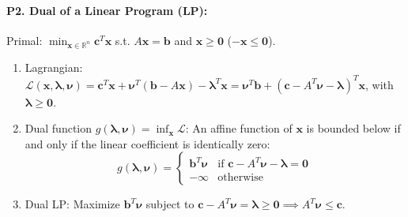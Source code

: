 \paragraph{P2. Dual of a Linear Program (LP):}
Primal: $\min_{\mathbf{x} \in \mathbb{R}^n} \mathbf{c}^T \mathbf{x}$ s.t. $A\mathbf{x} = \mathbf{b}$ and $\mathbf{x} \ge \mathbf{0}$ ($-\mathbf{x} \le \mathbf{0}$).
\begin{enumerate}[label=(\alph*)]
    \item Lagrangian: $\mathcal{L}(\mathbf{x}, \boldsymbol{\lambda}, \boldsymbol{\nu}) = \mathbf{c}^T \mathbf{x} + \boldsymbol{\nu}^T (\mathbf{b} - A\mathbf{x}) - \boldsymbol{\lambda}^T \mathbf{x} = \boldsymbol{\nu}^T \mathbf{b} + (\mathbf{c} - A^T \boldsymbol{\nu} - \boldsymbol{\lambda})^T \mathbf{x}$, with $\boldsymbol{\lambda} \ge \mathbf{0}$.
    \item Dual function $g(\boldsymbol{\lambda}, \boldsymbol{\nu}) = \inf_{\mathbf{x}} \mathcal{L}$:
    An affine function of $\mathbf{x}$ is bounded below if and only if the linear coefficient is identically zero:
    \begin{equation*}
    g(\boldsymbol{\lambda}, \boldsymbol{\nu}) = \begin{cases} \mathbf{b}^T \boldsymbol{\nu} & \text{if } \mathbf{c} - A^T \boldsymbol{\nu} - \boldsymbol{\lambda} = \mathbf{0} \\ -\infty & \text{otherwise} \end{cases}
    \end{equation*}
    \item Dual LP: Maximize $\mathbf{b}^T \boldsymbol{\nu}$ subject to $\mathbf{c} - A^T \boldsymbol{\nu} = \boldsymbol{\lambda} \ge \mathbf{0} \implies A^T \boldsymbol{\nu} \le \mathbf{c}$.
\end{enumerate}

